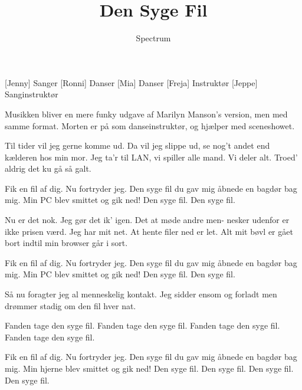 \documentclass[a4paper,11pt]{article}
\title{Den Syge Fil}
\author{Spectrum}
\begin{document}
 \maketitle

 \begin{roles}
   [Jenny] Sanger
   [Ronni] Danser
   [Mia] Danser
   [Freja] Instruktør
   [Jeppe] Sanginstruktør
 \end{roles}

 \begin{song}
   \scene
     {Musikken bliver en mere funky udgave af Marilyn Manson's version, men med samme format. Morten er på som danseinstruktør, og hjælper med sceneshowet. }

    Til tider vil jeg gerne komme ud.
    Da vil jeg slippe ud,
    se nog't andet end kælderen hos min mor.
    Jeg ta'r til LAN,
    vi spiller alle mand.
    Vi deler alt.
    Troed' aldrig det ku gå så galt.

    Fik en fil af dig.
    Nu fortryder jeg.
    Den syge fil du gav mig
    åbnede en bagdør bag mig.
    Min PC blev smittet og gik ned!
    Den syge fil.
    Den syge fil.

    Nu er det nok.
    Jeg gør det ik' igen.
    Det at møde andre men-
    nesker udenfor
    er ikke prisen værd.
    Jeg har mit net.
    At hente filer ned er let.
    Alt mit bøvl er gået bort
    indtil min browser går i sort.

    Fik en fil af dig.
    Nu fortryder jeg.
    Den syge fil du gav mig
    åbnede en bagdør bag mig.
    Min PC blev smittet og gik ned!
    Den syge fil.
    Den syge fil.

    Så nu foragter
    jeg al menneskelig kontakt.
    Jeg sidder ensom og forladt
    men drømmer stadig om den fil hver nat.

    Fanden tage den syge fil.
    Fanden tage den syge fil.
    Fanden tage den syge fil.
    Fanden tage den syge fil.

    Fik en fil af dig.
    Nu fortryder jeg.
    Den syge fil du gav mig
    åbnede en bagdør bag mig.
    Min hjerne blev smittet og gik ned!
    Den syge fil.
    Den syge fil.
    Den syge fil.
    Den syge fil.

 \end{song}
\end{document}
